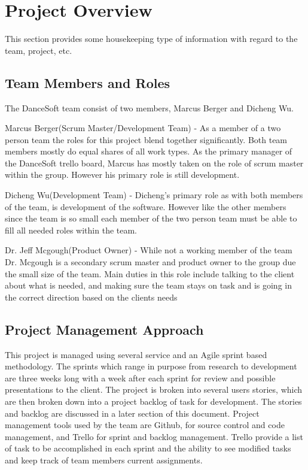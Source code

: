 

\chapter{Project Overview}
This section provides some housekeeping type of information with regard to the 
team, project, etc. 



\section{Team Members and Roles}
The DanceSoft team consist of two members, Marcus Berger and Dicheng Wu.

Marcus Berger(Scrum Master/Development Team) -  As a member of a two person team the roles for this project blend together significantly. Both team members mostly do equal shares of all work types. As the primary manager of the DanceSoft trello board, Marcus has mostly taken on the role of scrum master within the group. However his primary role is still development.

Dicheng Wu(Development Team) - Dicheng's primary role as with both members of the team, is development of the software. However like the other members since the team is so small each member of the two person team must be able to fill all needed roles within the team.

Dr. Jeff Mcgough(Product Owner) - While not a working member of the team Dr. Mcgough is a secondary scrum master and product owner to the group due the small size of the team. Main duties in this role include talking to the client about what is needed, and making sure the team stays on task and is going in the correct direction based on the clients needs 


\section{Project  Management Approach}
This project is managed using several service and an Agile sprint based methodology. The sprints which range in purpose from research to development are three weeks long with a week after each sprint for review and possible presentations to the client. The project is broken into several users stories, which are then broken down into a project backlog of task for development. The stories and backlog are discussed  in a later section of this document. Project management tools used by the team are Github, for source control and code management, and Trello for sprint and backlog management. Trello provide a list of task to be accomplished in each sprint and the ability to see modified tasks and keep track of team members current assignments.


